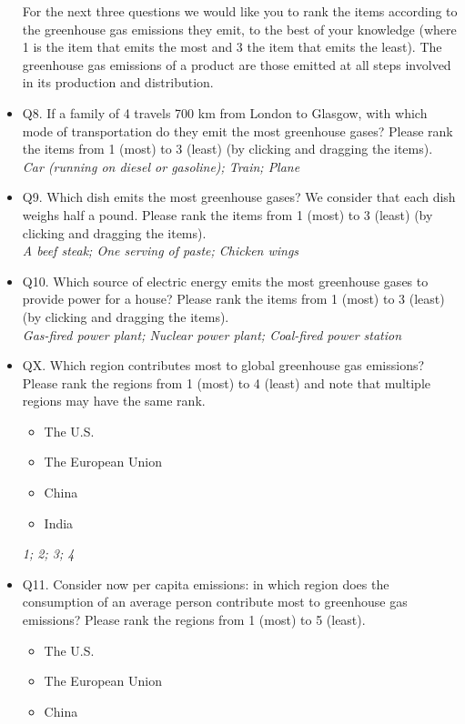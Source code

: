 \documentclass{article}
\begin{document}
\begin{itemize}
    For the next three questions we would like you to rank the items according to the greenhouse gas emissions they emit, to the best of your knowledge (where 1 is the item that emits the most and 3 the item that emits the least).
    The greenhouse gas emissions of a product are those emitted at all steps involved in its production and distribution.
    \item Q8. If a family of 4 travels 700 km from London to Glasgow, with which mode of transportation do they emit the most greenhouse gases?
    Please rank the items from 1 (most) to 3 (least) (by clicking and dragging the items).\\
    \textit{Car (running on diesel or gasoline); Train; Plane}
    \item Q9. Which dish emits the most greenhouse gases? We consider that each dish weighs half a pound.
    Please rank the items from 1 (most) to 3 (least) (by clicking and dragging the items).\\
    \textit{A beef steak; One serving of paste; Chicken wings}
    \item Q10. Which source of electric energy emits the most greenhouse gases to provide power for a house?
    Please rank the items from 1 (most) to 3 (least) (by clicking and dragging the items).\\
    \textit{Gas-fired power plant; Nuclear power plant; Coal-fired power station}
    \item QX. Which region contributes most to global greenhouse gas emissions? Please rank the regions from 1 (most) to 4 (least) and note that multiple regions may have the same rank.
        \begin{itemize}
            \item The U.S.
            \item The European Union
            \item China
            \item India
        \end{itemize}
    \textit{1; 2; 3; 4}
    \item Q11. Consider now per capita emissions: in which region does the consumption of an average person contribute most to greenhouse gas emissions?
    Please rank the regions from 1 (most) to 5 (least).
        \begin{itemize}
            \item The U.S.
            \item The European Union
            \item China

\end{itemize}
\end{itemize}
\end{document}
